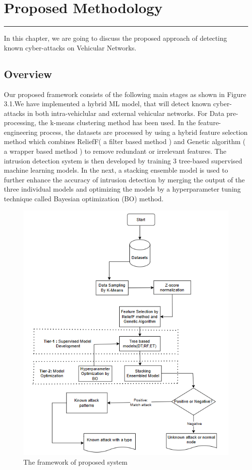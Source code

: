 \chapter{Proposed Methodology}
\hrule
\vspace{.5cm}
\par 
In this chapter, we are going to discuss the proposed approach of detecting known cyber-attacks on Vehicular Networks.

\section{Overview}
Our proposed framework consists of the following main stages as shown in Figure 3.1.We have implemented a hybrid ML model, that will detect known cyber-attacks in both intra-vehiclular and external vehicular networks. For Data pre-processing, the k-means clustering method has been used. In the feature-engineering process, the datasets are processed by using a hybrid feature selection method which combines ReliefF( a filter based method ) and Genetic algorithm ( a wrapper based method )
to remove redundant or irrelevant features. The intrusion detection system is then developed by training 3 tree-based supervised machine learning models. In the next, a stacking ensemble model is
used to further enhance the accuracy of intrusion detection by
merging the output of the three individual models \cite{yang2021mth} and optimizing the models by a hyperparameter tuning technique called Bayesian optimization (BO) method.

\begin{figure}[htbp]
\centerline{\includegraphics[width=0.7 \textwidth]
{img/fw_final.png}}
\caption{The framework of proposed system}
\label{fig}
\end{figure}

